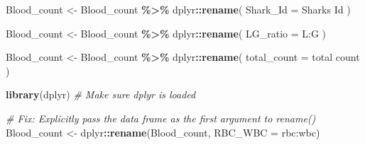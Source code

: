 \documentclass[
]{article}
\newenvironment{Shaded}{\begin{snugshade}}{\end{snugshade}}
\newcommand{\AttributeTok}[1]{\textcolor[rgb]{0.13,0.29,0.53}{#1}}
\newcommand{\CommentTok}[1]{\textcolor[rgb]{0.56,0.35,0.01}{\textit{#1}}}
\newcommand{\FunctionTok}[1]{\textcolor[rgb]{0.13,0.29,0.53}{\textbf{#1}}}
\newcommand{\NormalTok}[1]{#1}
\newcommand{\OtherTok}[1]{\textcolor[rgb]{0.56,0.35,0.01}{#1}}
\newcommand{\SpecialCharTok}[1]{\textcolor[rgb]{0.81,0.36,0.00}{\textbf{#1}}}
\newcommand{\StringTok}[1]{\textcolor[rgb]{0.31,0.60,0.02}{#1}}
\begin{document}
\begin{Shaded}
\begin{Highlighting}[]
\NormalTok{Blood\_count }\OtherTok{\textless{}{-}}\NormalTok{ Blood\_count }\SpecialCharTok{\%\textgreater{}\%}
\NormalTok{  dplyr}\SpecialCharTok{::}\FunctionTok{rename}\NormalTok{(}
    \StringTok{\textasciigrave{}}\AttributeTok{Shark\_Id}\StringTok{\textasciigrave{}} \OtherTok{=} \StringTok{\textasciigrave{}}\AttributeTok{Sharks Id}\StringTok{\textasciigrave{}}
\NormalTok{  )}
\end{Highlighting}
\end{Shaded}

\begin{Shaded}
\begin{Highlighting}[]
\NormalTok{Blood\_count }\OtherTok{\textless{}{-}}\NormalTok{ Blood\_count }\SpecialCharTok{\%\textgreater{}\%}
\NormalTok{  dplyr}\SpecialCharTok{::}\FunctionTok{rename}\NormalTok{(}
    \StringTok{\textasciigrave{}}\AttributeTok{LG\_ratio}\StringTok{\textasciigrave{}} \OtherTok{=} \StringTok{\textasciigrave{}}\AttributeTok{L:G}\StringTok{\textasciigrave{}}
\NormalTok{  )}
\end{Highlighting}
\end{Shaded}

\begin{Shaded}
\begin{Highlighting}[]
\NormalTok{Blood\_count }\OtherTok{\textless{}{-}}\NormalTok{ Blood\_count }\SpecialCharTok{\%\textgreater{}\%}
\NormalTok{  dplyr}\SpecialCharTok{::}\FunctionTok{rename}\NormalTok{(}
    \AttributeTok{total\_count        =} \StringTok{\textasciigrave{}}\AttributeTok{total count}\StringTok{\textasciigrave{}}
\NormalTok{  )}
\end{Highlighting}
\end{Shaded}

\begin{Shaded}
\begin{Highlighting}[]
\FunctionTok{library}\NormalTok{(dplyr) }\CommentTok{\# Make sure dplyr is loaded}

\CommentTok{\# Fix: Explicitly pass the data frame as the first argument to rename()}
\NormalTok{Blood\_count }\OtherTok{\textless{}{-}}\NormalTok{ dplyr}\SpecialCharTok{::}\FunctionTok{rename}\NormalTok{(Blood\_count, }\AttributeTok{RBC\_WBC =} \StringTok{\textasciigrave{}}\AttributeTok{rbc:wbc}\StringTok{\textasciigrave{}}\NormalTok{)}
\end{Highlighting}
\end{Shaded}
\end{document}
